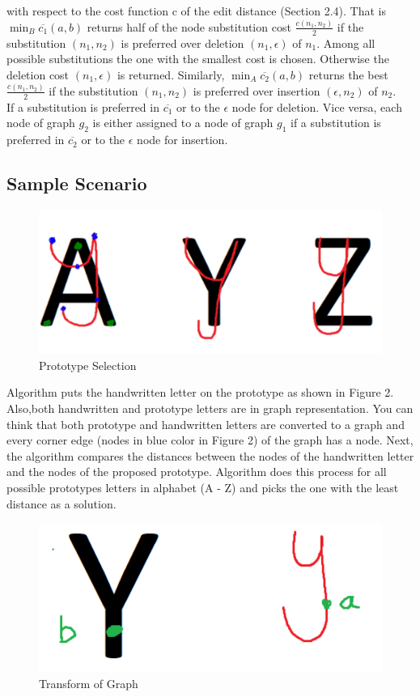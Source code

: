 \documentclass{article}
\begin{document}
with respect to the cost function c of the edit distance (Section 2.4). That is $ \min _{B} \overline{c_{1}}(a, b)$ returns half of the node substitution cost $\frac{c(n_1,n_2)}{2}$ if the substitution $(n_1,n_2)$ is preferred over deletion $(n_1,\epsilon)$ of $n_1$. Among all possible substitutions the one with the smallest cost is chosen. Otherwise the deletion cost $(n_1,\epsilon)$ is returned. Similarly,  $ \min _{A} \overline{c_{2}}(a, b)$ returns the  best $\frac{c(n_1,n_2)}{2}$ if the substitution  $(n_1,n_2)$ is preferred over insertion $(\epsilon,n_2)$ of $n_2$. \\

If a substitution is preferred in $\overline{c_{1}}$ or to the $\epsilon$ node for deletion. Vice versa, each node of graph $g_2$ is either assigned to a node of graph $g_1$ if a substitution is preferred in $\overline{c_{2}}$ or to the $\epsilon$ node for insertion.

\subsection{Sample Scenario}





\begin{center}
\end{center}
\begin{figure}[h]
    \centering
    \includegraphics[width = .5\textwidth]{Images/over.png}
    \caption{Prototype Selection}
\end{figure}

Algorithm puts the handwritten letter on the prototype as shown in Figure 2. Also,both handwritten and prototype letters are in graph representation. You can think that both prototype and handwritten letters are converted to a graph and every corner edge (nodes in blue color in Figure 2) of the graph has a node. Next, the algorithm compares the distances between the nodes of the handwritten letter and the nodes of the proposed prototype. Algorithm does this process for all possible prototypes letters in alphabet (A - Z) and picks the one with the least distance as a solution. 

\begin{center}
\end{center}
\begin{figure}[h]
    \centering
    \includegraphics[width = .5\textwidth]{Images/node_comparision.png}
    \caption{Transform of Graph}
\end{figure}
\end{document}
